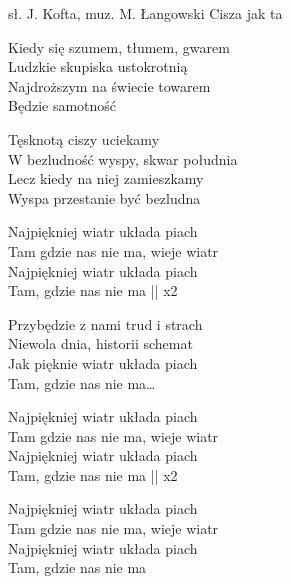{sł. J. Kofta, muz. M. Łangowski}
{Cisza jak ta}
\begin{text}
\hfill\break
Kiedy się szumem, tłumem, gwarem \\
Ludzkie skupiska ustokrotnią \\
Najdroższym na świecie towarem \\
Będzie samotność

\hfill\break
Tęsknotą ciszy uciekamy \\
W bezludność wyspy, skwar południa \\
Lecz kiedy na niej zamieszkamy \\
Wyspa przestanie być bezludna


\vin Najpiękniej wiatr układa piach \\
\vin Tam gdzie nas nie ma, wieje wiatr \\
\vin Najpiękniej wiatr układa piach \\
\vin Tam, gdzie nas nie ma || x2

Przybędzie z nami trud i strach \\
Niewola dnia, historii schemat \\
Jak pięknie wiatr układa piach \\
Tam, gdzie nas nie ma…

\vin Najpiękniej wiatr układa piach \\
\vin Tam gdzie nas nie ma, wieje wiatr \\
\vin Najpiękniej wiatr układa piach \\
\vin Tam, gdzie nas nie ma || x2

\hfill\break
\vin Najpiękniej wiatr układa piach \\
\vin Tam gdzie nas nie ma, wieje wiatr \\
\vin Najpiękniej wiatr układa piach \\
\vin Tam, gdzie nas nie ma
\end{text}
